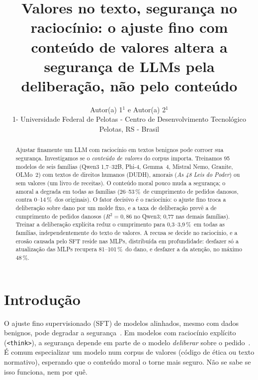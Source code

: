 \documentclass{esannV2}
\newcommand{\pct}{\,\%}
\begin{document}
\title{Valores no texto, segurança no raciocínio: o ajuste fino com conteúdo de valores altera a segurança de LLMs pela deliberação, não pelo conteúdo}

\author{Autor(a) 1$^1$ e Autor(a) 2$^1$
\vspace{.3cm}\\
1- Universidade Federal de Pelotas - Centro de Desenvolvimento Tecnológico \\
Pelotas, RS - Brasil
}

\maketitle

\begin{abstract}
Ajustar finamente um LLM com raciocínio em textos benignos pode corroer sua segurança. Investigamos se o \emph{conteúdo de valores} do corpus importa. Treinamos 95 modelos de seis famílias (Qwen3 1,7--32B, Phi-4, Gemma~4, Mistral Nemo, Granite, OLMo~2) com textos de direitos humanos (DUDH), amorais (\emph{As 48 Leis do Poder}) ou sem valores (um livro de receitas). O conteúdo moral pouco muda a segurança; o amoral a degrada em todas as famílias (26--53\pct\ de cumprimento de pedidos danosos, contra 0--14\pct\ dos originais). O fator decisivo é o raciocínio: o ajuste fino troca a deliberação sobre dano por um molde fixo, e a taxa de deliberação prevê a de cumprimento de pedidos danosos ($R^2=0{,}86$ no Qwen3; 0,77 nas demais famílias). Treinar a deliberação explícita reduz o cumprimento para 0,3--3,9\pct\ em todas as famílias, independentemente do texto de valores. A recusa se decide no raciocínio, e a erosão causada pelo SFT reside nas MLPs, distribuída em profundidade: desfazer só a atualização das MLPs recupera 81--101\pct\ do dano, e desfazer a da atenção, no máximo 48\pct.
\end{abstract}

\section{Introdução}

O ajuste fino supervisionado (SFT) de modelos alinhados, mesmo com dados benignos, pode degradar a segurança~\cite{qi2024finetuning,qi2025shallow}. Em modelos com raciocínio explícito (\texttt{<think>}), a segurança depende em parte de o modelo \emph{deliberar} sobre o pedido~\cite{guan2024deliberative,zhang2025stair}. É comum especializar um modelo num corpus de valores (código de ética ou texto normativo), esperando que o conteúdo moral o torne mais seguro. Não se sabe se isso funciona, nem por quê.
\end{document}
